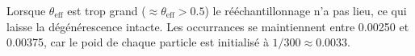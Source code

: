 \documentclass[../CSC_5RO12_TA_TP3.tex]{subfiles}
\begin{document}
\begin{remark}
    Lorsque $\theta_{\text{eff}}$ est trop grand ($\approx \theta_{\text{eff}} > 0.5$) le rééchantillonnage n'a pas lieu, ce qui laisse la dégénérescence intacte. Les occurrances se maintiennent entre 0.00250 et 0.00375, car le poid de chaque particle est initialisé à $1/300 \approx 0.0033$.
\end{remark}
\end{document}
